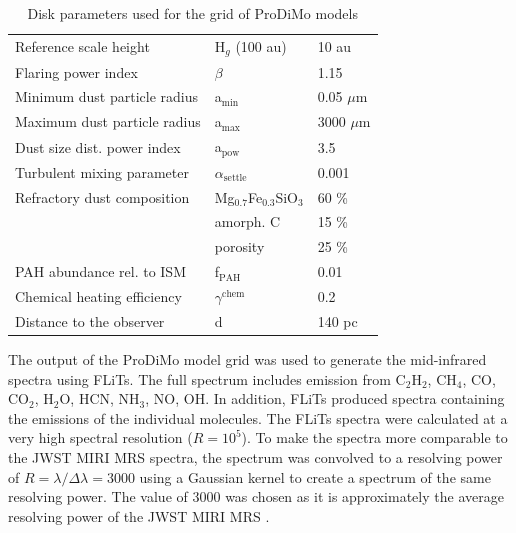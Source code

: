 \documentclass[oneside, single, authoryear, semicolon, 12pt]{lion-msc}
\newcommand{\4}{$_4$}
\newcommand{\3}{$_3$}
\newcommand{\2}{$_2$}
\begin{document}
\begin{table}[H]
\begin{tabular}{@{}lll@{}}
Reference scale height            & H$_g$ (100 au)              & 10 au                      \\
Flaring power index               & $\beta$                     & 1.15                       \\ \midrule
Minimum dust particle radius      & a$_{\mathrm{min}}$                   & 0.05 $\mu$m                \\
Maximum dust particle radius      & a$_{\mathrm{max}}$                   & 3000 $\mu$m                \\
Dust size dist. power index       & a$_{\mathrm{pow}}$                   & 3.5                        \\
Turbulent mixing parameter        & $\alpha_{\mathrm{settle}}$           & 0.001                      \\
Refractory dust composition       & Mg$_{0.7}$Fe$_{0.3}$SiO\3 & 60 \%                      \\
                                  & amorph. C                   & 15 \%                      \\
                                  & porosity                    & 25 \%                      \\
PAH abundance rel. to ISM         & f$_{\mathrm{PAH}}$                   & 0.01                       \\
Chemical heating efficiency       & $\gamma^{\mathrm{chem}}$             & 0.2                        \\ \midrule
Distance to the observer          & d                           & 140 pc                     \\ \bottomrule
\end{tabular}
\caption{Disk parameters used for the grid of ProDiMo models}
\label{tab: parameters}
\end{table}


The output of the ProDiMo model grid was used to generate the mid-infrared spectra using FLiTs. The full spectrum includes emission from C\2H\2, CH\4, CO, CO\2, H\2O, HCN, NH\3, NO, OH. In addition, FLiTs produced spectra containing the emissions of the individual molecules. The FLiTs spectra were calculated at a very high spectral resolution ($R=10^5$). To make the spectra more comparable to the JWST MIRI MRS spectra, the spectrum was convolved to a resolving power of $R = \lambda/\Delta\lambda = 3000$ using a Gaussian kernel to create a spectrum of the same resolving power. The value of 3000 was chosen as it is approximately the average resolving power of the JWST MIRI MRS \citep{Argyriou_2023}. 
\end{document}
